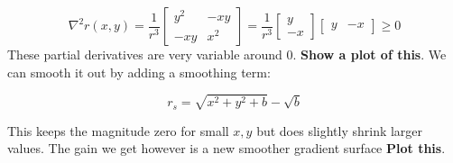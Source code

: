 $$\nabla^2 r(x,y) = \frac{1}{r^3} 
\begin{bmatrix}
  y^2 & -xy \\
  -xy & x^2
\end{bmatrix}
 = \frac{1}{r^3} \begin{bmatrix} y \\ -x \end{bmatrix} 
 \begin{bmatrix} y & -x \end{bmatrix} \geq 0 
$$
These partial derivatives are very variable around 0. \textbf{Show a plot of this}. We can smooth it out by
adding a smoothing term:

$$ r_s = \sqrt{x^2 + y^2 + b} - \sqrt{b} $$

This keeps the magnitude zero for small $x,y$ but does slightly shrink larger values. The gain we
get however is a new smoother gradient surface \textbf{Plot this}.
